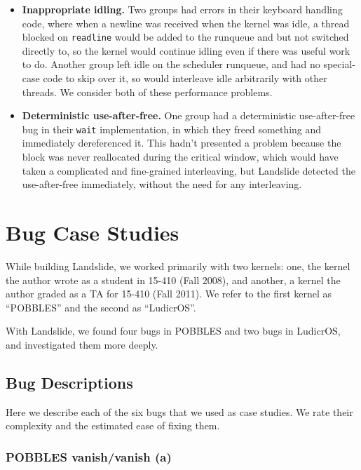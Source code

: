 \begin{itemize}
	\item {\bf Inappropriate idling.} Two groups had errors in their keyboard handling code, where when a newline was received when the kernel was idle, a thread blocked on \texttt{readline} would be added to the runqueue and but not switched directly to, so the kernel would continue idling even if there was useful work to do. Another group left idle on the scheduler runqueue, and had no special-case code to skip over it, so would interleave idle arbitrarily with other threads. We consider both of these performance problems.
	\item {\bf Deterministic use-after-free.} One group had a deterministic use-after-free bug in their \texttt{wait} implementation, in which they freed something and immediately dereferenced it. This hadn't presented a problem because the block was never reallocated during the critical window, which would have taken a complicated and fine-grained interleaving, but Landslide detected the use-after-free immediately, without the need for any interleaving.
\end{itemize}

\section{Bug Case Studies}
\label{sec:eval-casestudy}

While building Landslide, we worked primarily with two kernels: one, the kernel the author wrote as a student in 15-410 (Fall 2008), and another, a kernel the author graded as a TA for 15-410 (Fall 2011). We refer to the first kernel as ``POBBLES'' and the second as ``LudicrOS''.

With Landslide, we found four bugs in POBBLES and two bugs in LudicrOS, and investigated them more deeply.

\subsection{Bug Descriptions}

Here we describe each of the six bugs that we used as case studies. We rate their complexity and the estimated ease of fixing them.

\subsubsection{POBBLES vanish/vanish (a)}

